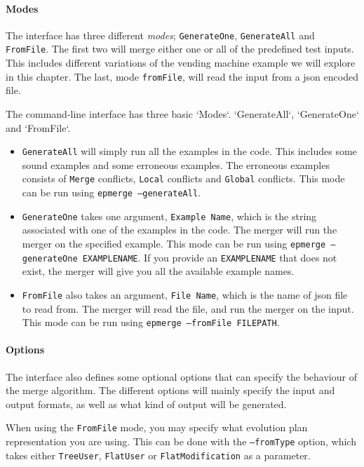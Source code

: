 \documentclass[a4paper,english]{ifimaster}
\begin{document}
\paragraph{Modes}%
\label{par:modes}

The interface has three different \textit{modes}; \texttt{GenerateOne}, \texttt{GenerateAll} and \texttt{FromFile}. The first two will merge either one or all of the predefined test inputs. This includes different variations of the vending machine example we will explore in this chapter. The last, mode \texttt{fromFile}, will read the input from a json encoded file.

The command-line interface has three basic `Modes`. `GenerateAll`, `GenerateOne` and `FromFile`.

\begin{itemize}
\item \texttt{GenerateAll} will simply run all the examples in the code. This includes some sound examples and some erroneous examples. The erroneous examples consists of \texttt{Merge} conflicts, \texttt{Local} conflicts and \texttt{Global} conflicts. This mode can be run using \texttt{epmerge --generateAll}.
\item \texttt{GenerateOne} takes one argument, \texttt{Example Name}, which is the string associated with one of the examples in the code. The merger will run the merger on the specified example. This mode can be run using \texttt{epmerge --generateOne EXAMPLENAME}. If you provide an \texttt{EXAMPLENAME} that does not exist, the merger will give you all the available example names.
\item \texttt{FromFile} also takes an argument, \texttt{File Name}, which is the name of json file to read from. The merger will read the file, and run the merger on the input. This mode can be run using \texttt{epmerge --fromFile FILEPATH}.
\end{itemize}

\paragraph{Options}%
\label{par:options}

The interface also defines some optional options that can specify the behaviour of the merge algorithm. The different options will mainly specify the input and output formats, as well as what kind of output will be generated.

When using the \texttt{FromFile} mode, you may specify what evolution plan representation you are using. This can be done with the \texttt{--fromType} option, which takes either \texttt{TreeUser}, \texttt{FlatUser} or \texttt{FlatModification} as a parameter.
\end{document}
